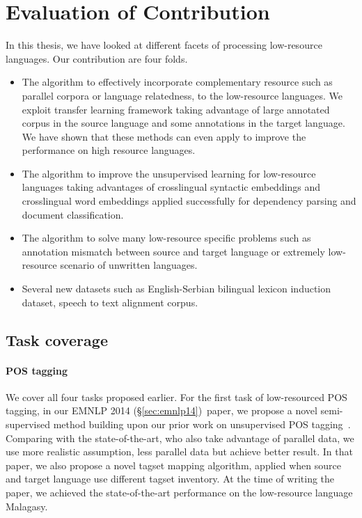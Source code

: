 \documentclass[12pt,twoside,final,hidelinks]{ltthesis}
\theoremstyle{definition}
\newcommand\emnlpiv{EMNLP 2014 (\S\ref{sec:emnlp14})}
\begin{document}
\section{Evaluation of Contribution}
\label{sec:evaluation_contribution} 
In this thesis, we have looked at different facets of processing low-resource languages. Our contribution are four folds. 
\begin{itemize}
\item The algorithm to effectively incorporate complementary resource such as parallel corpora or language relatedness, to the low-resource languages. We exploit transfer learning framework taking advantage of large annotated corpus in the source language and some annotations in the target language. We have shown that these methods can even apply to improve 
the performance on high resource languages. 
\item The algorithm to improve the unsupervised learning for low-resource languages taking advantages of crosslingual syntactic embeddings and crosslingual 
word embeddings applied successfully for dependency parsing and document classification. 
\item The algorithm to solve many low-resource specific problems such as annotation mismatch between source and target language or extremely low-resource scenario of unwritten languages.
\item Several new datasets such as English-Serbian bilingual lexicon induction dataset, speech to text alignment corpus. 
\end{itemize}

\subsection{Task coverage}
\paragraph{POS tagging} We cover all four tasks proposed earlier. For the first task of low-resourced POS tagging, in our \emnlpiv\ paper, we propose a novel semi-supervised method building 
upon our prior work on unsupervised POS tagging~\cite{duongIJCNLP,Duongacl13}. Comparing with 
the state-of-the-art, who also take advantage of parallel data, we use more realistic assumption, less parallel data but achieve better result. 
In that paper, we also propose a novel tagset mapping algorithm, applied when source and target language use different tagset inventory. At the 
time of writing the paper, we achieved the state-of-the-art performance on the low-resource language Malagasy. 
\end{document}
